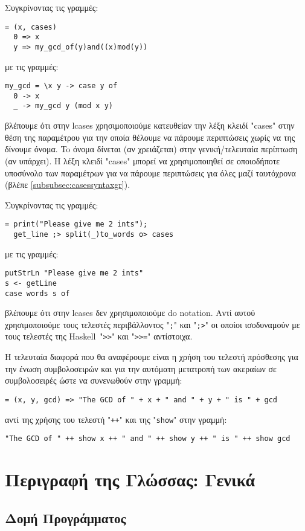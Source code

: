 \documentclass[diploma]{softlab-thesis}
\def\H{Haskell}
\begin{document}
Συγκρίνοντας τις γραμμές:
\begin{verbatim}
= (x, cases)
  0 => x
  y => my_gcd_of(y)and((x)mod(y))
\end{verbatim}
με τις γραμμές:
\begin{verbatim}
my_gcd = \x y -> case y of
  0 -> x
  _ -> my_gcd y (mod x y)
\end{verbatim}
βλέπουμε ότι στην lcases χρησιμοποιούμε κατευθείαν την λέξη κλειδί "cases"
στην θέση της παραμέτρου για την οποία θέλουμε να πάρουμε περιπτώσεις χωρίς
να της δίνουμε όνομα. To όνομα δίνεται (αν χρειάζεται) στην γενική/τελευταία
περίπτωση (αν υπάρχει). Η λέξη κλειδί "cases" μπορεί να χρησιμοποιηθεί σε
οποιοδήποτε υποσύνολο των παραμέτρων για να πάρουμε περιπτώσεις για όλες μαζί
ταυτόχρονα (βλέπε \ref{subsubsec:casessyntaxgr}).

Συγκρίνοντας τις γραμμές:
\begin{verbatim}
= print("Please give me 2 ints");
  get_line ;> split(_)to_words o> cases
\end{verbatim}
με τις γραμμές:
\begin{verbatim}
putStrLn "Please give me 2 ints"
s <- getLine
case words s of
\end{verbatim}
βλέπουμε ότι στην lcases δεν χρησιμοποιούμε do notation. Αντί αυτού
χρησιμοποιούμε τους τελεστές περιβάλλοντος "\verb|;|" και "\verb|;>|" οι οποίοι
ισοδυναμούν με τους τελεστές της \H\ "\verb|>>|" και "\verb|>>=|" αντίστοιχα.

Η τελευταία διαφορά που θα αναφέρουμε είναι η χρήση του τελεστή πρόσθεσης για
την ένωση συμβολοσειρών και για την αυτόματη μετατροπή των ακεραίων σε
συμβολοσειρές ώστε να συνενωθούν στην γραμμή:
\begin{verbatim}
= (x, y, gcd) => "The GCD of " + x + " and " + y + " is " + gcd
\end{verbatim}
αντί της χρήσης του τελεστή "\verb|++|" και της "\verb|show|" στην γραμμή:
\begin{verbatim}
"The GCD of " ++ show x ++ " and " ++ show y ++ " is " ++ show gcd
\end{verbatim}

\chapter{Περιγραφή της Γλώσσας: Γενικά}

\section{Δομή Προγράμματος}
\end{document}
